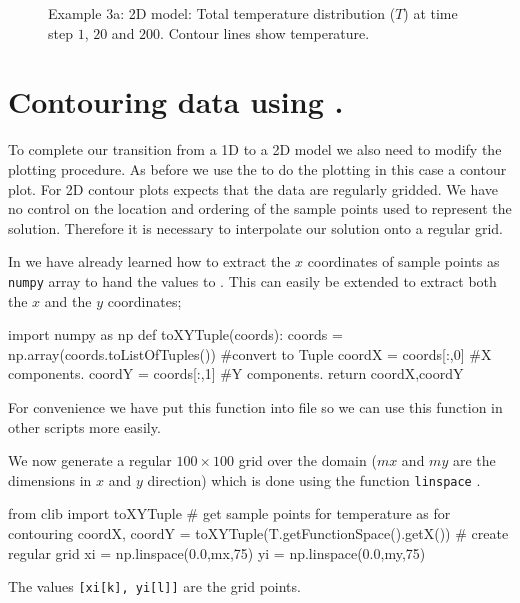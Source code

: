 \begin{figure}[ht]
\caption{Example 3a: 2D model: Total temperature distribution ($T$) at time step $1$, $20$ and $200$. Contour lines show temperature.}
\label{fig:twodhdans}
\end{figure}

\section{Contouring \esc data using \modmpl.}
\label{Sec:2DHD plot}
To complete our transition from a 1D to a 2D model we also need to modify the 
plotting procedure. As before we use the  \modmpl to do the plotting 
in this case a contour plot. For 2D contour plots \modmpl expects that the
data are regularly gridded. We have no control on the location and ordering of the sample points
used to represent the solution. Therefore it is necessary to interpolate our solution onto a regular grid.

In  we have already learned how to extract the $x$ coordinates of sample points as 
\verb|numpy| array to hand the values to \modmpl. This can easily be extended to extract both the
$x$ and the $y$ coordinates;
\begin{python}
import numpy as np
def toXYTuple(coords):
    coords = np.array(coords.toListOfTuples()) #convert to Tuple
    coordX = coords[:,0] #X components.
    coordY = coords[:,1] #Y components.
    return coordX,coordY
\end{python}
For convenience we have put this function into  file so we can use this
function in other scripts more easily. 


We now generate a regular $100 \times 100$ grid over the domain ($mx$ and $my$ 
are the dimensions in $x$ and $y$ direction) which is done using the \modnumpy function \verb|linspace|  . 
\begin{python}
from clib import toXYTuple
# get sample points for temperature as  for contouring      
coordX, coordY = toXYTuple(T.getFunctionSpace().getX())
# create regular grid
xi = np.linspace(0.0,mx,75)
yi = np.linspace(0.0,my,75)
\end{python}
The values \verb|[xi[k], yi[l]]| are the grid points.


